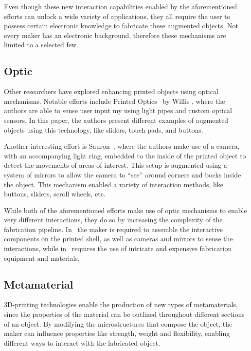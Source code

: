       Even though these new interaction capabilities enabled by the
      aforementioned efforts can unlock a wide variety of applications, they
      all require the user to possess certain electronic knowledge to fabricate
      these augmented objects. Not every maker has an electronic background,
      therefore these mechanisms are limited to a selected few.

    \subsection{Optic}
      Other researchers have explored enhancing printed objects using optical
      mechanisms. Notable efforts include Printed Optics~\cite{Willis:2012bc} by Willis \etal,
      where the authors are able to sense user input my using light pipes
      and custom optical sensors. In this paper, the authors present
      different examples of augmented objects using this technology, like
      sliders, touch pads, and buttons.

      Another interesting effort is Sauron~\cite{Savage:2013kua}, where the
      authors make use of a camera, with an accompanying light ring, embedded
      to the inside of the printed object to detect the movements of
      areas of interest. This setup is augmented using a
      system of mirrors to allow the camera to  ``see'' around corners and
      bocks inside the object. This mechanism enabled a variety of interaction
      methods, like buttons, sliders, scroll wheels, etc.
      
      While both of the aforementioned efforts make use of optic mechanisms to
      enable very different interactions, they do so by increasing the
      complexity of the fabrication pipeline. In~\cite{Savage:2013kua} the
      maker is required to assemble the interactive components on the printed
      shell, as well as cameras and mirrors to sense the interactions, while
      in~\cite{Willis:2012bc} requires the use of intricate and expensive
      fabrication equipment and materials.

    \subsection{Metamaterial}
      3D-printing technologies enable the production of new types of
      metamaterials, since the properties of the material can be outlined
      throughout different sections of an object. By modifying the
      microstructures that compose the object, the maker can influence
      properties like strength, weight and flexibility, enabling different ways
      to interact with the fabricated object.
      
